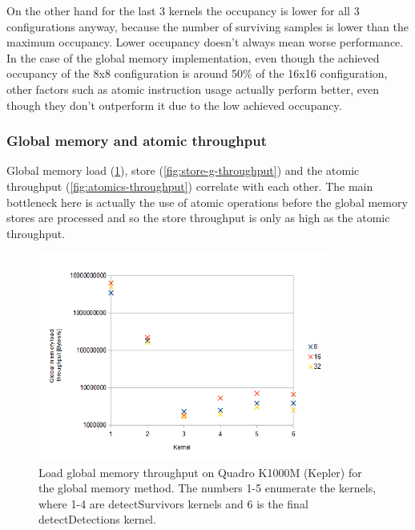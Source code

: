 On the other hand for the last 3 kernels the occupancy is lower for all 3 configurations anyway, because the number of surviving samples is lower than the maximum occupancy. Lower occupancy doesn't always mean worse performance. In the case of the global memory implementation, even though the achieved occupancy of the 8x8 configuration is around 50\% of the 16x16 configuration, other factors such as atomic instruction usage actually perform better, even though they don't outperform it due to the low achieved occupancy.

\subsubsection{Global memory and atomic throughput}

Global memory load (\ref{fig:load-g-throughput}), store (\ref{fig:store-g-throughput}) and the atomic throughput (\ref{fig:atomics-throughput}) correlate with each other. The main bottleneck here is actually the use of atomic operations before the global memory stores are processed and so the store throughput is only as high as the atomic throughput.

\begin{figure}[h]
	\label{fig:load-g-throughput}
	\centering\includegraphics[width=0.85\textwidth]{fig/load_gthroughput_quadro.png}
	\caption{Load global memory throughput on Quadro K1000M (Kepler) for the global memory method. The numbers 1-5 enumerate the kernels, where 1-4 are detectSurvivors kernels and 6 is the final detectDetections kernel.}
\end{figure}

